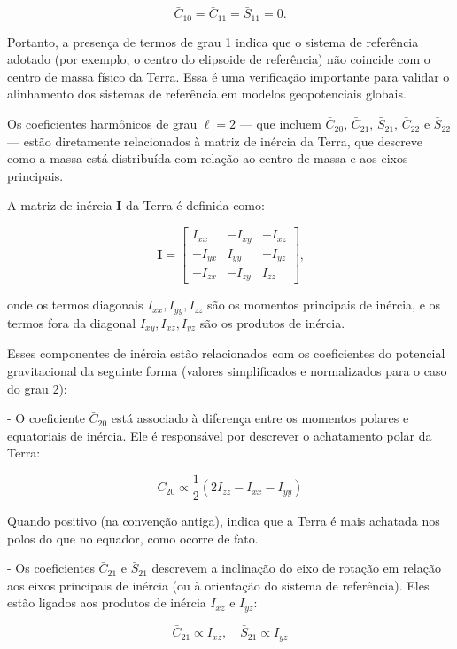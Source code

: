 \[
\bar{C}_{10} = \bar{C}_{11} = \bar{S}_{11} = 0 \text{.}
\]

Portanto, a presença de termos de grau 1 indica que o sistema de referência adotado (por exemplo, o centro do elipsoide de referência) não coincide com o centro de massa físico da Terra. Essa é uma verificação importante para validar o alinhamento dos sistemas de referência em modelos geopotenciais globais.

Os coeficientes harmônicos de grau \( \ell = 2 \) — que incluem \( \bar{C}_{20} \), \( \bar{C}_{21} \), \( \bar{S}_{21} \), \( \bar{C}_{22} \) e \( \bar{S}_{22} \) — estão diretamente relacionados à matriz de inércia da Terra, que descreve como a massa está distribuída com relação ao centro de massa e aos eixos principais.

A matriz de inércia \( \mathbf{I} \) da Terra é definida como:

\[
\mathbf{I} = 
\begin{bmatrix}
I_{xx} & -I_{xy} & -I_{xz} \\
-I_{yx} & I_{yy} & -I_{yz} \\
-I_{zx} & -I_{zy} & I_{zz}
\end{bmatrix}
\text{,}
\]

onde os termos diagonais \( I_{xx}, I_{yy}, I_{zz} \) são os momentos principais de inércia, e os termos fora da diagonal \( I_{xy}, I_{xz}, I_{yz} \) são os produtos de inércia.

Esses componentes de inércia estão relacionados com os coeficientes do potencial gravitacional da seguinte forma (valores simplificados e normalizados para o caso do grau 2):

- O coeficiente \( \bar{C}_{20} \) está associado à diferença entre os momentos polares e equatoriais de inércia. Ele é responsável por descrever o achatamento polar da Terra:

  \[
  \bar{C}_{20} \propto \frac{1}{2} \left( 2I_{zz} - I_{xx} - I_{yy} \right)
  \]

  Quando positivo (na convenção antiga), indica que a Terra é mais achatada nos polos do que no equador, como ocorre de fato.

- Os coeficientes \( \bar{C}_{21} \) e \( \bar{S}_{21} \) descrevem a inclinação do eixo de rotação em relação aos eixos principais de inércia (ou à orientação do sistema de referência). Eles estão ligados aos produtos de inércia \( I_{xz} \) e \( I_{yz} \):

  \[
  \bar{C}_{21} \propto I_{xz}, \quad \bar{S}_{21} \propto I_{yz}
  \]

